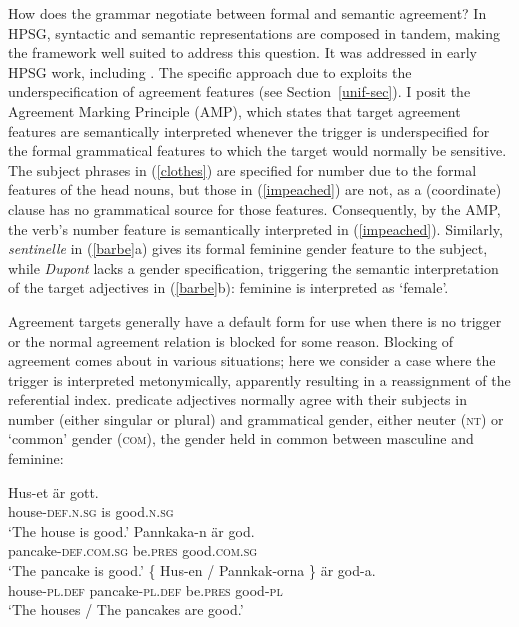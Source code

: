 \documentclass[output=paper
	        ,collection
	        ,collectionchapter
 	        ,biblatex
                ,babelshorthands
                ,newtxmath
                ,draftmode
                ,colorlinks, citecolor=brown
]{langscibook}
\begin{document}
How does the grammar negotiate between formal and semantic agreement?  In HPSG, syntactic and semantic representations are composed in tandem, making the framework well suited to address this question.   It was addressed in early HPSG work, including \cite[Chapter~1]{Pollard+Sag:1994}.   The specific approach due to \cite{Wechsler:2011} exploits the underspecification of agreement features (see Section~\ref{unif-sec}).  I posit the Agreement Marking Principle (AMP), which states that target agreement features are semantically interpreted whenever the trigger is underspecified for the formal grammatical features to which the target would normally be sensitive.   The subject phrases in (\ref{clothes}) are specified for number due to the formal features of the head nouns, but those in (\ref{impeached}) are not, as a (coordinate) clause has no grammatical source for those features.  Consequently, by the AMP, the verb's number feature is semantically interpreted in (\ref{impeached}).  Similarly, \textit{sentinelle} in (\ref{barbe}a) gives its formal feminine gender feature to the subject, while \textit{Dupont} lacks a gender specification, triggering the semantic interpretation of the target adjectives in (\ref{barbe}b): feminine is interpreted as `female'.    

Agreement targets generally have a default form for use when there is no trigger or the normal agreement relation is blocked for some reason.   
Blocking of agreement comes about in various situations; here we  consider a case where the trigger is interpreted metonymically,  apparently resulting in a reassignment of the referential index.   predicate adjectives normally agree with their subjects in number (either singular or plural) and grammatical gender, either neuter (\textsc{nt}) or `common' gender (\textsc{com}), the gender held in common between masculine and feminine: 

\begin{exe} 
\ex \label{huset}
 \begin{xlist}
\ex 
\gll 	Hus-et 	är	gott. \\
		house-\textsc{def.n.sg}	is	good.\textsc{n.sg} \\
\glt	`The house is good.’
\ex   
\gll  Pannkaka-n 	är	god. \\
	pancake-\textsc{def.com.sg} 	be.\textsc{pres} 	good.\textsc{com.sg} \\
\glt	`The pancake is good.’
\ex   
\gll   \{   Hus-en / Pannkak-orna 	\}	är	god-a. \\
	   {}   house-\textsc{pl.def} {} pancake-\textsc{pl.def} {} be.\textsc{pres} good-\textsc{pl}  \\
\glt	`The houses / The pancakes are good.’
\end{xlist}
\end{exe}
\end{document}
